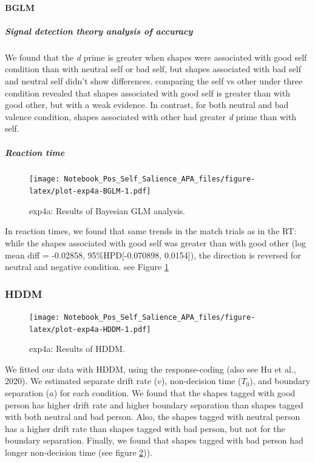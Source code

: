 \documentclass[
  english,
  man]{apa6}
\let\oldparagraph\paragraph
\renewcommand{\paragraph}[1]{\oldparagraph{#1}\mbox{}}
\let\oldsubparagraph\subparagraph
\renewcommand{\subparagraph}[1]{\oldsubparagraph{#1}\mbox{}}
\begin{document}
\hypertarget{bglm-5}{%
\paragraph{BGLM}\label{bglm-5}}

\hypertarget{signal-detection-theory-analysis-of-accuracy-7}{%
\subparagraph{Signal detection theory analysis of accuracy}\label{signal-detection-theory-analysis-of-accuracy-7}}

We found that the \emph{d} prime is greater when shapes were associated with good self condition than with neutral self or bad self, but shapes associated with bad self and neutral self didn't show differences. comparing the self vs other under three condition revealed that shapes associated with good self is greater than with good other, but with a weak evidence. In contrast, for both neutral and bad valence condition, shapes associated with other had greater \emph{d} prime than with self.

\hypertarget{reaction-time-11}{%
\subparagraph{Reaction time}\label{reaction-time-11}}

\begin{figure}
\centering
\texttt{[image: Notebook\_Pos\_Self\_Salience\_APA\_files/figure-latex/plot-exp4a-BGLM-1.pdf]}
\caption{\label{fig:plot-exp4a-BGLM}exp4a: Results of Bayesian GLM analysis.}
\end{figure}

In reaction times, we found that same trends in the match trials as in the RT: while the shapes associated with good self was greater than with good other (log mean diff = -0.02858, 95\%HPD{[}-0.070898, 0.0154{]}), the direction is reversed for neutral and negative condition. see Figure \ref{fig:plot-exp4a-BGLM}

\hypertarget{hddm-8}{%
\subsubsection{HDDM}\label{hddm-8}}

\begin{figure}
\centering
\texttt{[image: Notebook\_Pos\_Self\_Salience\_APA\_files/figure-latex/plot-exp4a-HDDM-1.pdf]}
\caption{\label{fig:plot-exp4a-HDDM}exp4a: Results of HDDM.}
\end{figure}

We fitted our data with HDDM, using the response-coding (also see Hu et al., 2020). We estimated separate drift rate (\(v\)), non-decision time (\(T_{0}\)), and boundary separation (\(a\)) for each condition. We found that the shapes tagged with good person has higher drift rate and higher boundary separation than shapes tagged with both neutral and bad person. Also, the shapes tagged with neutral person has a higher drift rate than shapes tagged with bad person, but not for the boundary separation. Finally, we found that shapes tagged with bad person had longer non-decision time (see figure \ref{fig:plot-exp4a-HDDM})).
\end{document}
